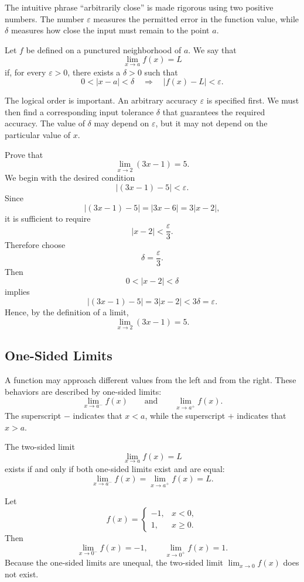 The intuitive phrase ``arbitrarily close'' is made rigorous using two positive numbers. The number \(\varepsilon\) measures the permitted error in the function value, while \(\delta\) measures how close the input must remain to the point \(a\).

\begin{bookdefinition}
Let \(f\) be defined on a punctured neighborhood of \(a\). We say that
\[
\lim_{x\to a}f(x)=L
\]
if, for every \(\varepsilon>0\), there exists a \(\delta>0\) such that
\[
0<|x-a|<\delta
\quad\Longrightarrow\quad
|f(x)-L|<\varepsilon.
\]
\end{bookdefinition}

The logical order is important. An arbitrary accuracy \(\varepsilon\) is specified first. We must then find a corresponding input tolerance \(\delta\) that guarantees the required accuracy. The value of \(\delta\) may depend on \(\varepsilon\), but it may not depend on the particular value of \(x\).

\begin{bookexample}
Prove that
\[
\lim_{x\to2}(3x-1)=5.
\]
We begin with the desired condition
\[
|(3x-1)-5|<\varepsilon.
\]
Since
\[
|(3x-1)-5|=|3x-6|=3|x-2|,
\]
it is sufficient to require
\[
|x-2|<\frac{\varepsilon}{3}.
\]
Therefore choose
\[
\delta=\frac{\varepsilon}{3}.
\]
Then
\[
0<|x-2|<\delta
\]
implies
\[
|(3x-1)-5|=3|x-2|<3\delta=\varepsilon.
\]
Hence, by the definition of a limit,
\[
\boxed{\lim_{x\to2}(3x-1)=5.}
\]
\end{bookexample}

\subsection{One-Sided Limits}

A function may approach different values from the left and from the right. These behaviors are described by one-sided limits:
\[
\lim_{x\to a^-}f(x)
\qquad\text{and}\qquad
\lim_{x\to a^+}f(x).
\]
The superscript \(-\) indicates that \(x<a\), while the superscript \(+\) indicates that \(x>a\).

\begin{bookprinciple}
The two-sided limit
\[
\lim_{x\to a}f(x)=L
\]
exists if and only if both one-sided limits exist and are equal:
\[
\lim_{x\to a^-}f(x)
=
\lim_{x\to a^+}f(x)
=L.
\]
\end{bookprinciple}

\begin{bookexample}
Let
\[
f(x)=
\begin{cases}
-1, & x<0,\\
 1, & x\geq0.
\end{cases}
\]
Then
\[
\lim_{x\to0^-}f(x)=-1,
\qquad
\lim_{x\to0^+}f(x)=1.
\]
Because the one-sided limits are unequal, the two-sided limit \(\lim_{x\to0}f(x)\) does not exist.
\end{bookexample}

